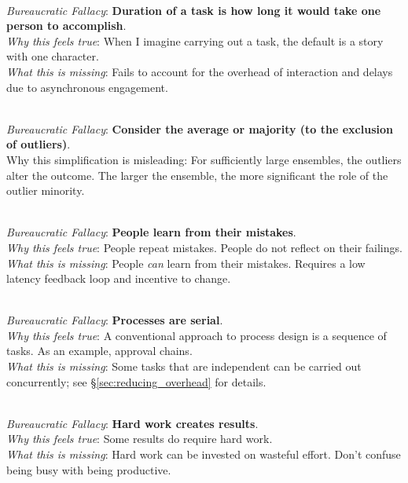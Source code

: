 \ \\

\textit{Bureaucratic Fallacy}: \textbf{Duration of a task is how long it would take one person to accomplish}.  \\
\textit{Why this feels true}: When I imagine carrying out a task, the default is a story with one character. \\
\textit{What this is missing}: Fails to account for the overhead of interaction and delays due to asynchronous engagement.


\ \\

\textit{Bureaucratic Fallacy}: \textbf{Consider the average or majority (to the exclusion of outliers)}. \\
Why this simplification is misleading: For sufficiently large ensembles, the outliers alter the outcome. The larger the ensemble, the more significant the role of the outlier minority.

\ \\

\textit{Bureaucratic Fallacy}: \textbf{People learn from their mistakes}. \\
\textit{Why this feels true}: People repeat mistakes. People do not reflect on their failings. \\
\textit{What this is missing}: People \textit{can} learn from their mistakes. Requires a low latency feedback loop and incentive to change.

\ \\

\textit{Bureaucratic Fallacy}: \textbf{Processes are serial}.\\
\textit{Why this feels true}: A conventional approach to process design is a sequence of tasks. As an example, approval chains. \\
\textit{What this is missing}: Some tasks that are independent can be carried out concurrently; see \S\ref{sec:reducing_overhead} for details.


\ \\

\textit{Bureaucratic Fallacy}: \textbf{Hard work creates results}.\\
\textit{Why this feels true}: Some results do require hard work. \\
\textit{What this is missing}: Hard work can be invested on wasteful effort. Don't confuse being busy with being productive.

